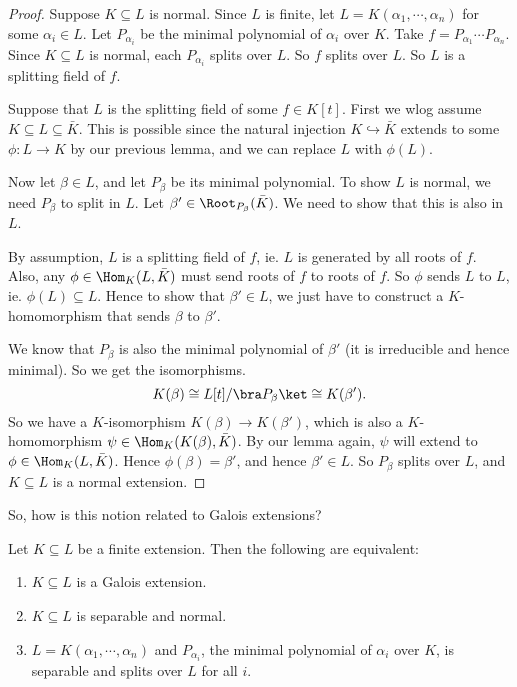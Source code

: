 \documentclass[a4paper]{article}
\begin{document}
\begin{proof}
  Suppose $K\subseteq L$ is normal. Since $L$ is finite, let $L = K(\alpha_1, \cdots, \alpha_n)$ for some $\alpha_i \in L$. Let $P_{\alpha_i}$ be the minimal polynomial of $\alpha_i$ over $K$. Take $f = P_{\alpha_1}\cdots P_{\alpha_n}$. Since $K\subseteq L$ is normal, each $P_{\alpha_i}$ splits over $L$. So $f$ splits over $L$. So $L$ is a splitting field of $f$.

  Suppose that $L$ is the splitting field of some $f \in K[t]$. First we wlog assume $K\subseteq L \subseteq \bar K$. This is possible since the natural injection $K\hookrightarrow \bar{K}$ extends to some $\phi:L \to K$ by our previous lemma, and we can replace $L$ with $\phi(L)$.

  Now let $\beta\in L$, and let $P_{\beta}$ be its minimal polynomial. To show $L$ is normal, we need $P_\beta$ to split in $L$. Let $\beta' \in \Root_{P_\beta}(\bar K)$. We need to show that this is also in $L$.

  By assumption, $L$ is a splitting field of $f$, ie. $L$ is generated by all roots of $f$. Also, any $\phi \in \Hom_K(L, \bar{K})$ must send roots of $f$ to roots of $f$. So $\phi$ sends $L$ to $L$, ie. $\phi(L) \subseteq L$. Hence to show that $\beta' \in L$, we just have to construct a $K$-homomorphism that sends $\beta$ to $\beta'$.

  We know that $P_\beta$ is also the minimal polynomial of $\beta'$ (it is irreducible and hence minimal). So we get the isomorphisms.
  \[
    K(\beta) \cong L[t]/\bra P_\beta\ket \cong K(\beta').
  \]
  So we have a $K$-isomorphism $K(\beta) \to K(\beta')$, which is also a $K$-homomorphism $\psi \in \Hom_K(K(\beta), \bar{K})$. By our lemma again, $\psi$ will extend to $\phi \in \Hom_K(L, \bar{K})$. Hence $\phi(\beta) = \beta'$, and hence $\beta' \in L$. So $P_\beta$ splits over $L$, and $K\subseteq L$ is a normal extension.
\end{proof}

So, how is this notion related to Galois extensions?
\begin{thm}[]
  Let $K\subseteq L$ be a finite extension. Then the following are equivalent:
  \begin{enumerate}
    \item $K\subseteq L$ is a Galois extension.
    \item $K\subseteq L$ is separable and normal.
    \item $L = K(\alpha_1, \cdots, \alpha_n)$ and $P_{\alpha_i}$, the minimal polynomial of $\alpha_i$ over $K$, is separable and splits over $L$ for all $i$.
  \end{enumerate}
\end{thm}
\end{document}
